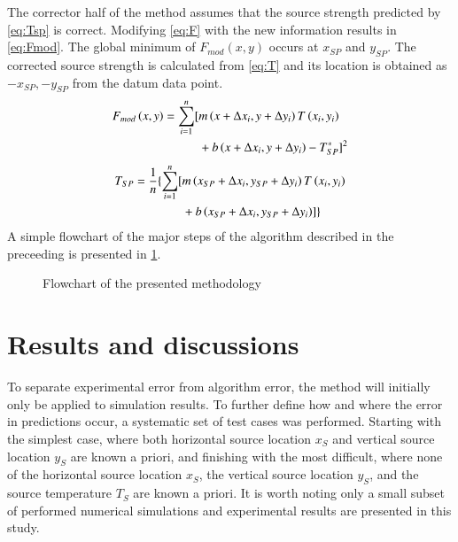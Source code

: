 \documentclass[preprint,12pt]{elsarticle}
\begin{document}
The corrector half of the method assumes that the source strength predicted by \cref{eq:Tsp} is correct.  Modifying \cref{eq:F} with the new information results in \cref{eq:Fmod}.  The global minimum of $F_{mod}\left( x,y \right)$ occurs at $x_{SP}$ and $y_{SP}$.  The corrected source strength is calculated from \cref{eq:T} and its location is obtained as $-x_{SP},-y_{SP}$ from the datum data point.
%
\begin{equation}
\centering
\begin{split}
F_{mod}\left( x,y \right) = \sum^{n}_{i=1} [ &m\left( x+\Delta x_i, y+\Delta y_i \right) T\left( x_i,y_i\right) \\
 & + b\left( x+\Delta x_i, y+\Delta y_i \right)-T^{\ast}_{SP} ]^2
\label{eq:Fmod}
\end{split}
\end{equation}
%
\begin{equation}
\centering
\begin{split}
T_{SP} = \frac{1}{n} \{ \sum^{n}_{i=1} [ &m\left( x_{SP}+\Delta x_i, y_{SP}+\Delta y_i \right) T\left( x_i,y_i\right)   \\
	&  + b\left( x_{SP}+\Delta x_i, y_{SP}+\Delta y_i \right) ] \}
\label{eq:T}
\end{split}
\end{equation}
%
A simple flowchart of the major steps of the algorithm described in the preceeding is presented in \cref{fig:flowchart}.

\begin{figure}[!tbp]
\centering

\caption{Flowchart of the presented methodology}
\label{fig:flowchart}
\end{figure}




\section{Results and discussions}

To separate experimental error from algorithm error, the method will initially only be applied to simulation results.  To further define how and where the error in predictions occur, a systematic set of test cases was performed.  Starting with the simplest case, where both horizontal source location $x_S$ and vertical source location $y_S$ are known a priori, and finishing with the most difficult, where none of the horizontal source location $x_S$, the vertical source location $y_S$, and the source temperature $T_S$ are known a priori.  It is worth noting only a small subset of performed numerical simulations and experimental results are presented in this study.
\end{document}
